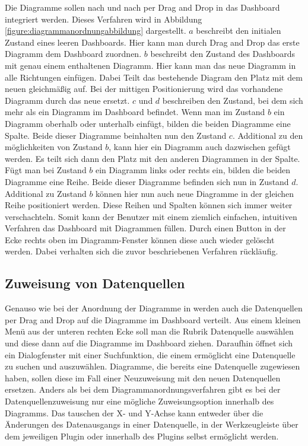 Die Diagramme sollen nach und nach per Drag and Drop in das Dashboard integriert werden. Dieses Verfahren
wird in Abbildung \ref{figure:diagrammanordnungabbildung} dargestellt. \(a\) beschreibt den
initialen Zustand eines leeren Dashboards. Hier kann man durch Drag and Drop das erste Diagramm dem Dashboard
zuordnen. \(b\) beschreibt den Zustand des Dashboards mit genau einem enthaltenen Diagramm. Hier kann man das
neue Diagramm in alle Richtungen einfügen. Dabei Teilt das bestehende Diagram den Platz mit dem neuen gleichmäßig
auf. Bei der mittigen Positionierung wird das vorhandene Diagramm durch das neue ersetzt. \(c\) und \(d\)
beschreiben den Zustand, bei dem sich mehr als ein Diagramm im Dashboard befindet. Wenn man im Zustand \(b\)
ein Diagramm oberhalb oder unterhalb einfügt, bilden die beiden Diagramme eine Spalte. Beide dieser Diagramme
beinhalten nun den Zustand \(c\). Additional zu den möglichkeiten von Zustand \(b\), kann hier ein Diagramm
auch dazwischen gefügt werden. Es teilt sich dann den Platz mit den anderen Diagrammen in der Spalte.
Fügt man bei Zustand \(b\) ein Diagramm links oder rechts ein, bilden die beiden Diagramme eine Reihe.
Beide dieser Diagramme befinden sich nun in Zustand \(d\). Additional zu Zustand \(b\) können hier nun
auch neue Diagramme in der gleichen Reihe positioniert werden. Diese Reihen und Spalten können sich
immer weiter verschachteln. Somit kann der Benutzer mit einem ziemlich einfachen, intuitiven Verfahren
das Dashboard mit Diagrammen füllen. Durch einen Button in der Ecke rechts oben im Diagramm-Fenster
können diese auch wieder gelöscht werden. Dabei verhalten sich die zuvor beschriebenen Verfahren rückläufig.

\subsection{Zuweisung von Datenquellen}
\label{subsec:zuweisungungvondatenquellen}
Genauso wie bei der Anordnung der Diagramme in  werden
auch die Datenquellen per Drag and Drop auf die Diagramme im Dashboard verteilt. Aus einem kleinen
Menü aus der unteren rechten Ecke soll man die Rubrik Datenquelle auswählen und diese dann auf
die Diagramme im Dashboard ziehen. Daraufhin öffnet sich ein Dialogfenster mit einer Suchfunktion,
die einem ermöglicht eine Datenquelle zu suchen und auszuwählen. Diagramme, die bereits eine
Datenquelle zugewiesen haben, sollen diese im Fall einer Neuzuweisung mit den neuen Datenquellen
ersetzen. Anders als bei dem Diagrammanordnungsverfahren gibt es bei der Datenquellenzuweisung
nur eine mögliche Zuweisungsoption innerhalb des Diagramms. Das tauschen der X- und Y-Achse kann
entweder über die Änderungen des Datenausgangs in einer Datenquelle, in der Werkzeugleiste über
dem jeweiligen Plugin oder innerhalb des Plugins selbst ermöglicht werden.

